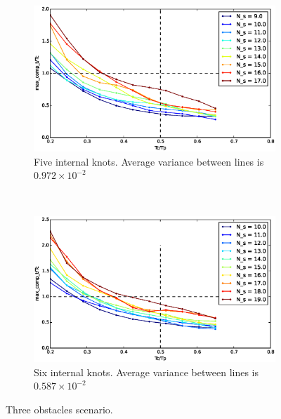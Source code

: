 \begin{figure}[!h]
        ~ %
        \begin{subfigure}[b]{0.48\textwidth}
                \includegraphics[width=\textwidth]{./img/realtime/Scenario_3__N_knots_5/mcttc-tctp.eps}
                \caption{Five internal knots. Average variance between lines is $0.972\times 10^{-2}$}\label{fig:uni35}
        \end{subfigure}
        ~ %
        \begin{subfigure}[b]{0.48\textwidth}
                \includegraphics[width=\textwidth]{./img/realtime/Scenario_3__N_knots_6/mcttc-tctp.eps}
                \caption{Six internal knots. Average variance between lines is $0.587\times 10^{-2}$}\label{fig:uni36}
        \end{subfigure}
        \caption{Three obstacles scenario.}\label{fig:uni3}
\end{figure}

